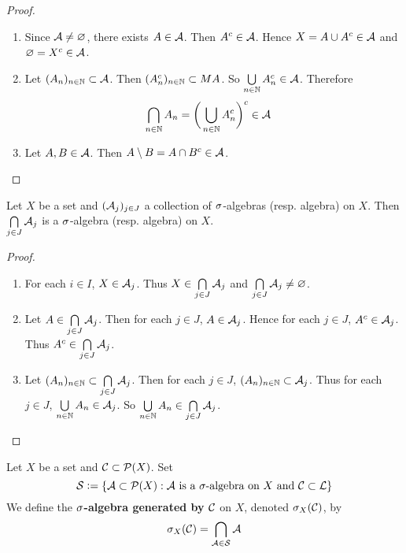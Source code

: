 \documentclass{book}
\begin{document}
	\begin{proof}\
		\begin{enumerate}
			\item Since $\mathcal{A} \neq \varnothing$, there exists $A \in \mathcal{A}$. Then $A^c \in \mathcal{A}$. Hence $X = A \cup A^c \in \mathcal{A}$ and $\varnothing = X^c \in \mathcal{A}$.
			\item Let $(A_n)_{n \in \mathbb{N}} \subset \mathcal{A}$. Then $(A_n^c)_{n \in \mathbb{N}} \subset MA$. So $\bigcup\limits_{n \in \mathbb{N}}A_n^c \in \mathcal{A}$. Therefore \begin{align*}
				\bigcap\limits_{n \in \mathbb{N}}A_n 
				&= \bigg(\bigcup\limits_{n \in \mathbb{N}}A_n^c\bigg)^c \in \mathcal{A}
			\end{align*}
			\item Let $A,B \in \mathcal{A}$. Then $A \setminus B = A \cap B^c \in \mathcal{A}$. 
		\end{enumerate}
	\end{proof}
	
	\begin{ex}  
		Let $X$ be a set and $(\mathcal{A}_j)_{j \in J}$ a collection of $\sigma$-algebras (resp. algebra) on $X$. Then $\bigcap\limits_{j \in J}\mathcal{A}_j$ is a $\sigma$-algebra (resp. algebra) on $X$.
	\end{ex}
	
	\begin{proof}\
		\begin{enumerate}
			\item For each $i \in I$, $X \in \mathcal{A}_j$. Thus $X \in \bigcap\limits_{j \in J}\mathcal{A}_j$ and $\bigcap\limits_{j \in J}\mathcal{A}_j \neq \varnothing$.
			\item Let $A \in \bigcap\limits_{j \in J}\mathcal{A}_j$. Then for each $j \in J$, $A \in \mathcal{A}_j$. Hence for each $j \in J$, $A^c \in \mathcal{A}_j$. Thus $A^c \in \bigcap\limits_{j \in J}\mathcal{A}_j$. 
			\item Let $(A_n)_{n \in \mathbb{N}} \subset \bigcap\limits_{j \in J}\mathcal{A}_j$. Then for each $j \in J$, $(A_n)_{n \in \mathbb{N}} \subset \mathcal{A}_j$. Thus for each $j \in J$, $\bigcup\limits_{n \in \mathbb{N}}A_n \in \mathcal{A}_j$. So $\bigcup\limits_{n \in \mathbb{N}}A_n \in \bigcap\limits_{j \in J}\mathcal{A}_j$.
		\end{enumerate}
	\end{proof}
	
	\begin{defn}  
		Let $X$ be a set and $\mathcal{C} \subset \mathcal{P}(X)$. Set 
		$$\mathcal{S} \vcentcolon= \{\mathcal{A} \subset \mathcal{P}(X): \mathcal{A} \text{ is a }\sigma\text{-algebra on }X \text{ and } \mathcal{C} \subset \mathcal{L}\}$$ 
		We define the \textbf{$\sigma$-algebra generated by $\mathcal{C}$} on $X$, denoted $\sigma_X(\mathcal{C})$, by $$\sigma_X(\mathcal{C}) = \bigcap_{\mathcal{A} \in \mathcal{S}} \mathcal{A} $$
	\end{defn}
\end{document}
